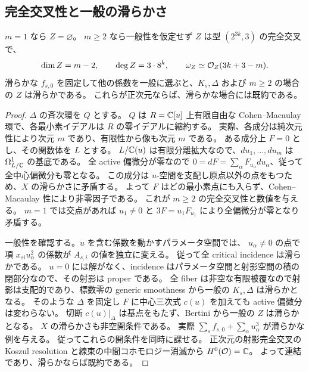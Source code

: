 \subsection{完全交叉性と一般の滑らかさ}
\begin{proposition}\label{prop:pg-zero-ci}
$m=1$ なら $Z=\varnothing$。
$m\geq2$ なら一般性を仮定せず $Z$ は型 $(2^{3k},3)$ の完全交叉で、
\begin{equation}
\dim Z=m-2,\qquad \deg Z=3\cdot8^k,\qquad
\omega_Z\simeq\mathcal O_Z(3k+3-m).
\end{equation}
滑らかな $f_{s,0}$ を固定して他の係数を一般に選ぶと、$K_s,\Delta$ および $m\geq2$ の場合の $Z$ は滑らかである。
これらが正次元ならば、滑らかな場合には既約である。
\end{proposition}
\begin{proof}
$\Delta$ の斉次環を $Q$ とする。
$Q$ は $R=\mathbb C[u]$ 上有限自由な Cohen--Macaulay 環で、各最小素イデアルは $R$ の零イデアルに縮約する。
実際、各成分は純次元性により次元 $m$ であり、有限性から像も次元 $m$ である。
ある成分上 $F=0$ とし、その関数体を $L$ とする。
$L/\mathbb C(u)$ は有限分離拡大なので、$du_1,\ldots,du_m$ は $\Omega^1_{L/\mathbb C}$ の基底である。
全 active 偏微分が零なので
$0=dF=\sum_\alpha F_{u_\alpha}du_\alpha$、従って全中心偏微分も零となる。
この成分は $u$-空間を支配し原点以外の点をもつため、$X$ の滑らかさに矛盾する。
よって $F$ はどの最小素点にも入らず、Cohen--Macaulay 性により非零因子である。
これが $m\geq2$ の完全交叉性と数値を与える。
$m=1$ では交点があれば $u_1\neq0$ と $3F=u_1F_{u_1}$ により全偏微分が零となり矛盾する。

一般性を確認する。$u$ を含む係数を動かすパラメータ空間では、
$u_\alpha\neq0$ の点で項 $x_{si}u_\alpha^2$ の係数が $A_{s,i}$ の値を独立に変える。
従って全 critical incidence は滑らかである。
$u=0$ には解がなく、incidence はパラメータ空間と射影空間の積の閉部分なので、その射影は proper である。
全 fiber は非空な有限被覆なので射影は支配的であり、標数零の generic smoothness から一般の $K_s,\Delta$ は滑らかとなる。
そのような $\Delta$ を固定し $F$ に中心三次式 $c(u)$ を加えても active 偏微分は変わらない。
切断 $c(u)|_\Delta$ は基点をもたず、Bertini から一般の $Z$ は滑らかとなる。
$X$ の滑らかさも非空開条件である。
実際 $\sum_sf_{s,0}+\sum_\alpha u_\alpha^3$ が滑らかな例を与える。
従ってこれらの開条件を同時に課せる。
正次元の射影完全交叉の Koszul resolution と線束の中間コホモロジー消滅から $H^0(\mathcal O)=\mathbb C$。
よって連結であり、滑らかならば既約である。
\end{proof}

